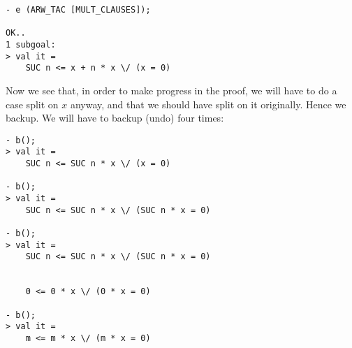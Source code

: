 \begin{session}\begin{verbatim}
- e (ARW_TAC [MULT_CLAUSES]);

OK..
1 subgoal:
> val it =
    SUC n <= x + n * x \/ (x = 0)
\end{verbatim}\end{session}
Now we see that, in order to make progress in the proof, we will have to
do a case split on $x$ anyway, and that we should have split on it
originally. Hence we backup. We will have to backup (undo) four times:
\begin{session}\begin{verbatim}
- b();
> val it =
    SUC n <= SUC n * x \/ (x = 0)

- b();
> val it =
    SUC n <= SUC n * x \/ (SUC n * x = 0)

- b();
> val it =
    SUC n <= SUC n * x \/ (SUC n * x = 0)


    0 <= 0 * x \/ (0 * x = 0)

- b();
> val it =
    m <= m * x \/ (m * x = 0)
\end{verbatim}\end{session}

